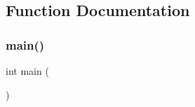 \subsection{Function Documentation}
\mbox{\label{tAItris_8c_ae66f6b31b5ad750f1fe042a706a4e3d4}} 
\subsubsection{main()}
{\footnotesize\ttfamily int main (\begin{DoxyParamCaption}{ }\end{DoxyParamCaption})}

